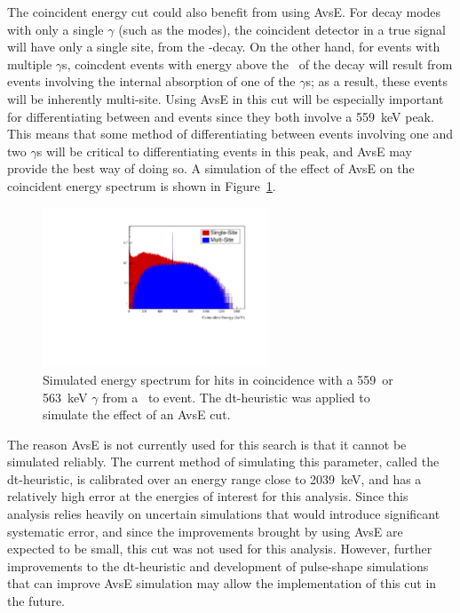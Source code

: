 \documentclass[/main.tex]{subfiles}
\begin{document}
The coincident energy cut could also benefit from using AvsE.
For decay modes with only a single $\gamma$ (such as the  modes), the coincident detector in a true signal will have only a single site, from the \bb -decay.
On the other hand, for events with multiple $\gamma$s, coincdent events with energy above the \Qval\ of the decay will result from events involving the internal absorption of one of the $\gamma$s; as a result, these events will be inherently multi-site.
Using AvsE in this cut will be especially important for differentiating between  and  events since they both involve a 559~keV peak.
This means that some method of differentiating between events involving one and two $\gamma$s will be critical to differentiating events in this peak, and AvsE may provide the best way of doing so.
A simulation of the effect of AvsE on the coincident energy spectrum is shown in Figure~\ref{fig:coincavse}.
\begin{figure}[tb]
  \centering
  \includegraphics[width=0.6\textwidth]{coincidentcutwithavse}
  \caption[Coincident energy spectrum with multi-site event cut]{\label{fig:coincavse}
    Simulated energy spectrum for hits in coincidence with a 559~or 563~keV $\gamma$ from a \tnbb\ to  event. The dt-heuristic was applied to simulate the effect of an AvsE cut.
  }
\end{figure}
The reason AvsE is not currently used for this search is that it cannot be simulated reliably.
The current method of simulating this parameter, called the dt-heuristic, is calibrated over an energy range close to 2039~keV, and has a relatively high error at the energies of interest for this analysis.
Since this analysis relies heavily on uncertain simulations that would introduce significant systematic error, and since the improvements brought by using AvsE are expected to be small, this cut was not used for this analysis.
However, further improvements to the dt-heuristic and development of pulse-shape simulations that can improve AvsE simulation may allow the implementation of this cut in the future.
\end{document}
